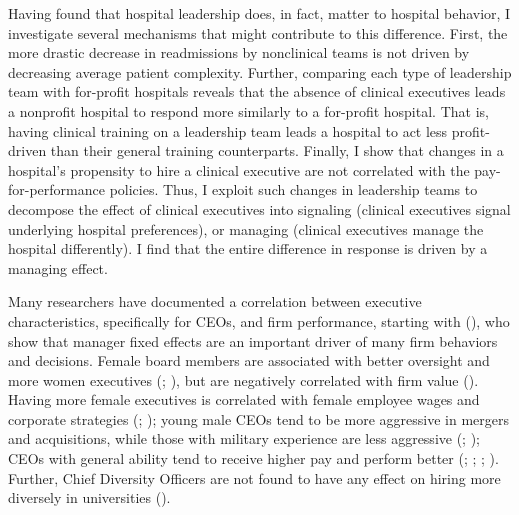 \documentclass[12pt]{article}
\begin{document}
    Having found that hospital leadership does, in fact, matter to hospital behavior, I investigate several mechanisms that might contribute to this difference. First, the more drastic decrease in readmissions by nonclinical teams is not driven by decreasing average patient complexity. Further, comparing each type of leadership team with for-profit hospitals reveals that the absence of clinical executives leads a nonprofit hospital to respond more similarly to a for-profit hospital. That is, having clinical training on a leadership team leads a hospital to act less profit-driven than their general training counterparts. Finally, I show that changes in a hospital's propensity to hire a clinical executive are not correlated with the pay-for-performance policies. Thus, I exploit such changes in leadership teams to decompose the effect of clinical executives into signaling (clinical executives signal underlying hospital preferences), or managing (clinical executives manage the hospital differently). I find that the entire difference in response is driven by a managing effect. 

    Many researchers have documented a correlation between executive characteristics, specifically for CEOs, and firm performance, starting with \citeauthor{bertrand2003managing} (\citeyear{bertrand2003managing}), who show that manager fixed effects are an important driver of many firm behaviors and decisions. Female board members are associated with better oversight and more women executives (\cite{matsa2011chipping}; \cite{adams2009women}), but are negatively correlated with firm value (\cite{ahern2012changing}). Having more female executives is correlated with female employee wages and corporate strategies (\cite{flabbi2019female}; \cite{matsa2013female}); young male CEOs tend to be more aggressive in mergers and acquisitions, while those with military experience are less aggressive (\cite{levi2010deal}; \cite{benmelech2015military}); CEOs with general ability tend to receive higher pay and perform better (\cite{kaplan2012ceo}; \cite{custodio2013generalists}; \cite{adams2018director}; \cite{frydman2019rising}). Further, Chief Diversity Officers are not found to have any effect on hiring more diversely in universities (\cite{bradley2022impact}). 
    
\end{document}
